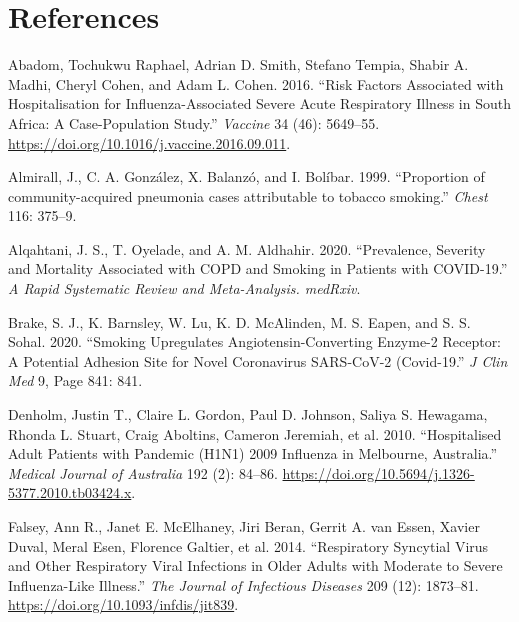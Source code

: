 \documentclass[
]{article}
\begin{document}
\hypertarget{references}{%
\section*{\texorpdfstring{\textbf{References}}{References}}\label{references}}

\hypertarget{refs}{}
\leavevmode\hypertarget{ref-Abadom_2016}{}%
Abadom, Tochukwu Raphael, Adrian D. Smith, Stefano Tempia, Shabir A.
Madhi, Cheryl Cohen, and Adam L. Cohen. 2016. ``Risk Factors Associated
with Hospitalisation for Influenza-Associated Severe Acute Respiratory
Illness in South Africa: A Case-Population Study.'' \emph{Vaccine} 34
(46): 5649--55. \url{https://doi.org/10.1016/j.vaccine.2016.09.011}.

\leavevmode\hypertarget{ref-Almirall_1999}{}%
Almirall, J., C. A. González, X. Balanzó, and I. Bolíbar. 1999.
``Proportion of community-acquired pneumonia cases attributable to
tobacco smoking.'' \emph{Chest} 116: 375--9.

\leavevmode\hypertarget{ref-Alqahtani_2020}{}%
Alqahtani, J. S., T. Oyelade, and A. M. Aldhahir. 2020. ``Prevalence,
Severity and Mortality Associated with COPD and Smoking in Patients with
COVID-19.'' \emph{A Rapid Systematic Review and Meta-Analysis. medRxiv}.

\leavevmode\hypertarget{ref-Brake_2020}{}%
Brake, S. J., K. Barnsley, W. Lu, K. D. McAlinden, M. S. Eapen, and S.
S. Sohal. 2020. ``Smoking Upregulates Angiotensin-Converting Enzyme-2
Receptor: A Potential Adhesion Site for Novel Coronavirus SARS-CoV-2
(Covid-19.'' \emph{J Clin Med} 9, Page 841: 841.

\leavevmode\hypertarget{ref-Denholm_2010}{}%
Denholm, Justin T., Claire L. Gordon, Paul D. Johnson, Saliya S.
Hewagama, Rhonda L. Stuart, Craig Aboltins, Cameron Jeremiah, et al.
2010. ``Hospitalised Adult Patients with Pandemic (H1N1) 2009 Influenza
in Melbourne, Australia.'' \emph{Medical Journal of Australia} 192 (2):
84--86. \url{https://doi.org/10.5694/j.1326-5377.2010.tb03424.x}.

\leavevmode\hypertarget{ref-Falsey_2014}{}%
Falsey, Ann R., Janet E. McElhaney, Jiri Beran, Gerrit A. van Essen,
Xavier Duval, Meral Esen, Florence Galtier, et al. 2014. ``Respiratory
Syncytial Virus and Other Respiratory Viral Infections in Older Adults
with Moderate to Severe Influenza-Like Illness.'' \emph{The Journal of
Infectious Diseases} 209 (12): 1873--81.
\url{https://doi.org/10.1093/infdis/jit839}.
\end{document}
